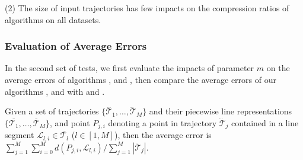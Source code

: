 \ni(2) The size of input trajectories has few impacts on the compression ratios of \lsa algorithms on all datasets.





\subsubsection{Evaluation of Average Errors}
In the second set of tests, we first evaluate the impacts of parameter $m$ on the average errors of algorithms \cisto, \cist and \cista, then compare the average errors of our algorithms \cisto, \cist and \cista with \dps and \squishe.

Given a set of trajectories $\{\dddot{\mathcal{T}_1}, \ldots, \dddot{\mathcal{T}}_M\}$ and their piecewise line representations $\{\overline{\mathcal{T}_1}, \ldots, \overline{\mathcal{T}}_M\}$, and point $P_{j,i}$ denoting
a point in trajectory $\dddot{\mathcal{T}}_j$ contained in a line segment $\mathcal{L}_{l,i}\in\overline{\mathcal{T}_l}$ ($l\in[1,M]$),
then the average error is $\sum_{j=1}^{M}\sum_{i=0}^{M} d(P_{j,i},
\mathcal{L}_{l,i})/\sum_{j=1}^{M}{|\dddot{\mathcal{T}}_j |}$.




